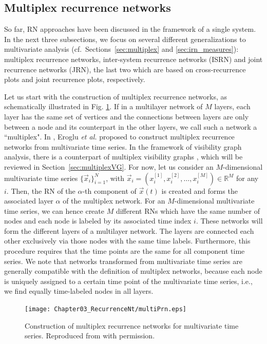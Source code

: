 	\subsection{Multiplex recurrence networks}\label{sec:mrn}
	So far, RN approaches have been discussed in the framework of a single system. In the next three subsections, we focus on several different generalizations to multivariate analysis (cf.\, Sections~\ref{sec:multiplex} and \ref{sec:irn_measures}): multiplex recurrence networks, inter-system recurrence networks (ISRN) and joint recurrence networks (JRN), the last two which are based on cross-recurrence plots and joint recurrence plots, respectively.

		Let us start with the construction of multiplex recurrence networks, as schematically illustrated in Fig. \ref{fig:multiRN}. If in a multilayer network of $M$ layers, each layer has the same set of vertices and the connections between layers are only between a node and its counterpart in the other layers, we call such a network a ``multiplex". In \cite{Eroglu2018}, Eroglu {\textit{et al.}} proposed to construct multiplex recurrence networks from multivariate time series. In the framework of visibility graph analysis, there is a counterpart of multiplex visibility graphs \cite{Lacasa2015b}, which will be reviewed in Section~\ref{sec:multiplexVG}. For now, let us consider an $M$-dimensional multivariate time series $\{{\vec{x}}_i \}_{i=1}^{N}$, with ${\vec{x}}_i = (x^{[1]}_i, x^{[2]}_i, \dots, x^{[M]}_i) \in \mathbb{R}^M$ for any $i$. Then, the RN of the $\alpha$-th component of ${\vec{x}}(t)$ is created and forms the associated layer $\alpha$ of the multiplex network. For an $M$-dimensional multivariate time series, we can hence create $M$ different RNs which have the same number of nodes and each node is labeled by its associated time index $i$. These networks will form the different layers of a multilayer network. The layers are connected each other exclusively via those nodes with the same time labels. Furthermore, this procedure requires that the time points are the same for all component time series. We note that networks transformed from multivariate time series are generally compatible with the definition of multiplex networks, because each node is uniquely assigned to a certain time point of the multivariate time series, i.e., we find equally time-labeled nodes in all layers.
		\begin{figure}
			\centering
			\texttt{[image: Chapter03\_RecurrenceNt/multiPrn.eps]}
		\caption{\small{Construction of multiplex recurrence networks for multivariate time series. Reproduced from \cite{Eroglu2018} with permission. } \label{fig:multiRN}}
		\end{figure}

